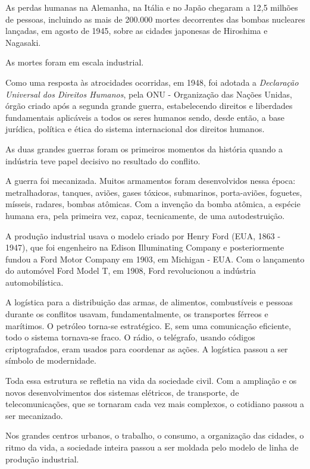 \documentclass{hipatia}
\begin{document}
As perdas humanas na Alemanha, na Itália e no Japão chegaram a 12,5 milhões de pessoas, incluindo as mais de 200.000 mortes decorrentes das bombas nucleares lançadas, em agosto de 1945, sobre as cidades japonesas de Hiroshima e Nagasaki.

As mortes foram em escala industrial. 

Como uma resposta às atrocidades ocorridas, em 1948, foi adotada a \textit{Declaração Universal dos Direitos Humanos}, pela ONU - Organização das Nações Unidas, órgão criado após a segunda grande guerra, estabelecendo direitos e liberdades fundamentais aplicáveis a todos os seres humanos sendo, desde então, a base jurídica, política e ética do sistema internacional dos direitos humanos. 

As duas grandes guerras foram os primeiros momentos da história quando a indústria teve papel decisivo no resultado do conflito. 

A guerra foi mecanizada. Muitos armamentos foram desenvolvidos nessa época: metralhadoras, tanques, aviões, gases tóxicos, submarinos, porta-aviões, foguetes, mísseis, radares, bombas atômicas. Com a invenção da bomba atômica, a espécie humana era, pela primeira vez, capaz, tecnicamente, de uma autodestruição.

A produção industrial usava o modelo criado por Henry Ford (EUA, 1863 - 1947), que foi engenheiro na Edison Illuminating Company e posteriormente fundou a Ford Motor Company em 1903, em Michigan - EUA. Com o lançamento do automóvel Ford Model T, em 1908, Ford revolucionou a indústria automobilística.

A logística para a distribuição das armas, de alimentos, combustíveis e pessoas durante os conflitos usavam, fundamentalmente, os transportes férreos e marítimos. 
O petróleo torna-se estratégico.
E, sem uma comunicação eficiente, todo o sistema tornava-se fraco. O rádio, o telégrafo, usando códigos criptografados, eram usados para coordenar as ações. 
A logística passou a ser símbolo de modernidade.

Toda essa estrutura se refletia na vida da sociedade civil. Com a ampliação e os novos desenvolvimentos dos sistemas elétricos, de transporte, de telecomunicações, que se tornaram cada vez mais complexos, o cotidiano passou a ser mecanizado.

Nos grandes centros urbanos, o trabalho, o consumo, a organização das cidades, o ritmo da vida, a sociedade inteira passou a ser moldada pelo modelo de linha de produção industrial.
\end{document}

